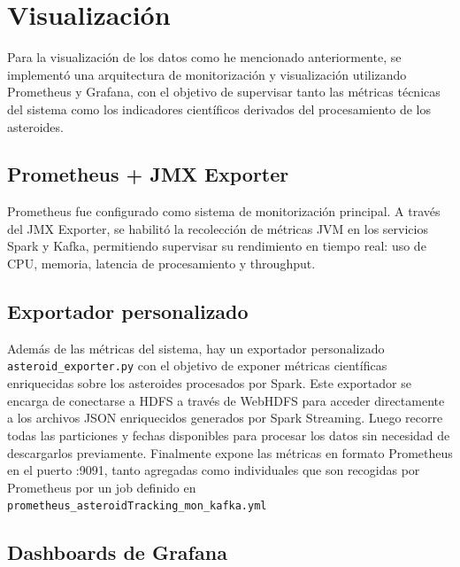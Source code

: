 \documentclass[12pt]{article}
\begin{document}
\section{Visualización}

Para la visualización de los datos como he mencionado anteriormente, se implementó una arquitectura de monitorización y visualización 
utilizando Prometheus y Grafana, con el objetivo de supervisar tanto las métricas técnicas del sistema como los indicadores 
científicos derivados del procesamiento de los asteroides.

\subsection{Prometheus + JMX Exporter}

Prometheus fue configurado como sistema de monitorización principal. A través del JMX Exporter, se habilitó la recolección de métricas 
JVM en los servicios Spark y Kafka, permitiendo supervisar su rendimiento en tiempo real: uso de CPU, memoria, latencia de 
procesamiento y throughput.

\subsection{Exportador personalizado}

Además de las métricas del sistema, hay un exportador personalizado \texttt{asteroid\_exporter.py} con el objetivo de 
exponer métricas científicas enriquecidas sobre los asteroides procesados por Spark.
Este exportador se encarga de conectarse a HDFS a través de WebHDFS para acceder directamente a los archivos JSON enriquecidos generados 
por Spark Streaming. Luego recorre todas las particiones y fechas disponibles para procesar los datos sin necesidad de descargarlos previamente.
Finalmente expone las métricas en formato Prometheus en el puerto :9091, tanto agregadas como individuales que son recogidas por 
Prometheus por un job definido en \texttt{prometheus\_asteroidTracking\_mon\_kafka.yml}

\subsection{Dashboards de Grafana}
\end{document}
